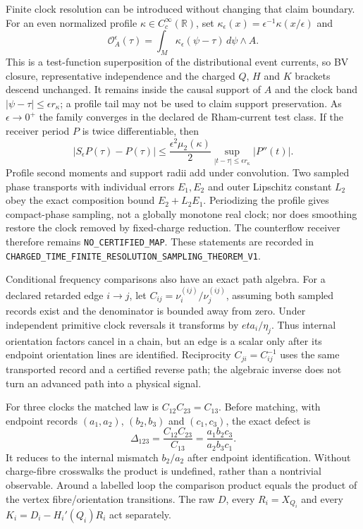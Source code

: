 \documentclass[11pt]{article}
\theoremstyle{definition}
\theoremstyle{remark}
\begin{document}
Finite clock resolution can be introduced without changing that claim
boundary.  For an even normalized profile $\kappa\in C_c^\infty(\mathbb R)$,
set $\kappa_\epsilon(x)=\epsilon^{-1}\kappa(x/\epsilon)$ and
\begin{equation}
 \mathcal O_A^\epsilon(\tau)
 =\int_M\kappa_\epsilon(\psi-\tau)\,d\psi\wedge A .
\end{equation}
This is a test-function superposition of the distributional event currents,
so BV closure, representative independence and the charged $Q$, $H$ and $K$
brackets descend unchanged.  It remains inside the causal support of $A$ and
the clock band $|\psi-\tau|\leq\epsilon r_\kappa$; a profile tail may not be
used to claim support preservation.  As $\epsilon\to0^+$ the family converges
in the declared de Rham-current test class.  If the receiver period $P$ is
twice differentiable, then
\begin{equation}
 |S_\epsilon P(\tau)-P(\tau)|
 \leq \frac{\epsilon^2\mu_2(\kappa)}2
       \sup_{|t-\tau|\leq\epsilon r_\kappa}|P''(t)|.
\end{equation}
Profile second moments and support radii add under convolution.  Two sampled
phase transports with individual errors $E_1,E_2$ and outer Lipschitz
constant $L_2$ obey the exact composition bound $E_2+L_2E_1$.  Periodizing
the profile gives compact-phase sampling, not a globally monotone real clock;
nor does smoothing restore the clock removed by fixed-charge reduction.  The
counterflow receiver therefore remains \texttt{NO\_CERTIFIED\_MAP}.  These
statements are recorded in
\texttt{CHARGED\_TIME\_FINITE\_RESOLUTION\_SAMPLING\_THEOREM\_V1}.

Conditional frequency comparisons also have an exact path algebra.  For a
declared retarded edge $i\to j$, let
$C_{ij}=\nu_i^{(ij)}/\nu_j^{(ij)}$, assuming both sampled records exist and
the denominator is bounded away from zero.  Under independent primitive
clock reversals it transforms by $eta_i/\eta_j$.  Thus internal orientation
factors cancel in a chain, but an edge is a scalar only after its endpoint
orientation lines are identified.  Reciprocity $C_{ji}=C_{ij}^{-1}$ uses the
same transported record and a certified reverse path; the algebraic inverse
does not turn an advanced path into a physical signal.

For three clocks the matched law is $C_{12}C_{23}=C_{13}$.  Before matching,
with endpoint records $(a_1,a_2)$, $(b_2,b_3)$ and $(c_1,c_3)$, the exact
defect is
\begin{equation}
 \Delta_{123}=\frac{C_{12}C_{23}}{C_{13}}
 =\frac{a_1b_2c_3}{a_2b_3c_1}.
\end{equation}
It reduces to the internal mismatch $b_2/a_2$ after endpoint identification.
Without charge-fibre crosswalks the product is undefined, rather than a
nontrivial observable.  Around a labelled loop the comparison product equals
the product of the vertex fibre/orientation transitions.  The raw $D$, every
$R_i=X_{Q_i}$ and every $K_i=D_i-H_i'(Q_i)R_i$ act separately.
\end{document}
